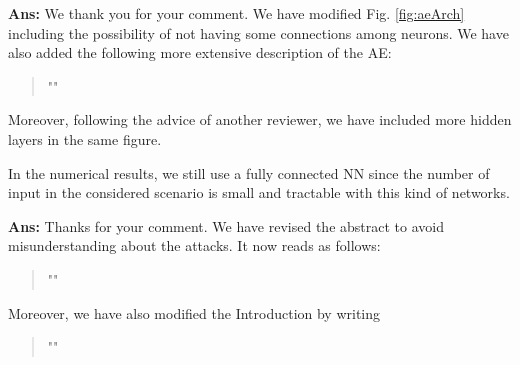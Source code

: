\documentclass[draftcls,onecolumn,12pt]{IEEEtran}
\newcounter{revc}
\newcommand{\revp}[1]{\zref[revcontent]{#1}}
\begin{document}
\vspace{5mm} %
\begin{framed}
\end{framed}

{\bf Ans:}  We thank you for your comment. We have modified Fig. \ref{fig:aeArch} including the possibility of not having some connections among neurons. We have also added the following more extensive description of the AE:
\begin{quote}
    "\revp{deep ae}"
\end{quote}
Moreover, following the advice of another reviewer, we have included more hidden layers in the same figure.

In the numerical results, we still use a fully connected NN since the number of input in the considered scenario is small and tractable with this kind of networks.

    
 
\vspace{5mm} %
\begin{framed}
\end{framed}

{\bf Ans:} Thanks for your comment. We have revised the abstract to avoid misunderstanding about the attacks. It now reads as follows:
\begin{quote}
    "\revp{rev14}"
\end{quote}
Moreover, we have also modified the Introduction by writing
\begin{quote}
    "\revp{rev14b}"
\end{quote}
\end{document}
